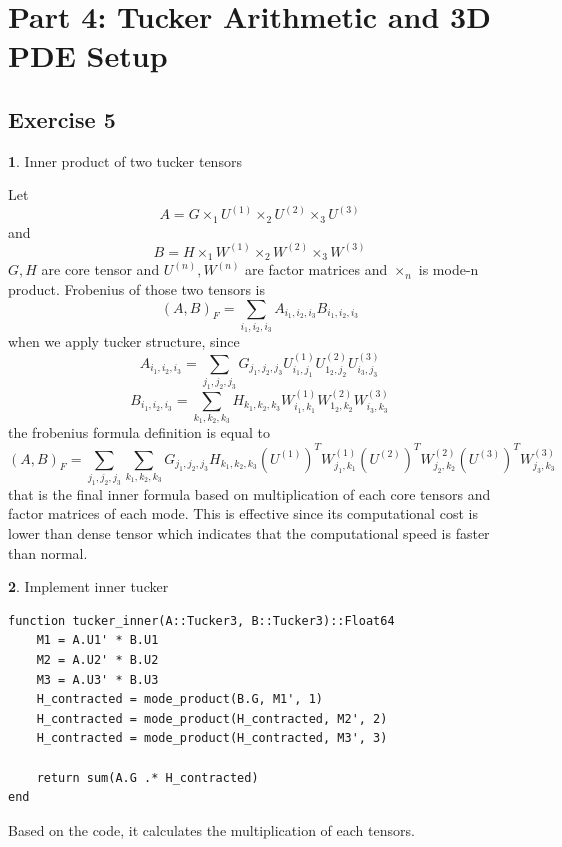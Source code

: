 \documentclass[11pt]{article}
\begin{document}
\section*{Part 4: Tucker Arithmetic and 3D PDE Setup}
\subsection*{Exercise 5}
\textbf{1}. Inner product of two tucker tensors

\vspace{1em}

Let
\[
A = G \times _1 U ^{(1)} \times _2 U ^{(2)} \times _3 U ^{(3)}
\]
and
\[
B = H\times _1 W ^{(1)} \times _2 W ^{(2)} \times _3 W ^{(3)}
\]
$G, H$ are core tensor and $U^{(n)}, W^{(n)}$ are factor matrices and $\times_n$ is mode-n product. Frobenius of those two tensors is 
\[
(A,B)_F = \sum_{i_1,i_2,i_3} A_{i_1,i_2,i_3} B_{i_1,i_2,i_3}
\]
when we apply tucker structure, since
\[
A_{i_1,i_2,i_3} = \sum_{j_1,j_2,j_3} G _{j_1,j_2,j_3} U ^{(1)}_{i_1,j_1} U ^{(2)} _{1_2,j_2}  U ^{(3)}_{i_3,j_3}
\]
\[
B_{i_1,i_2,i_3} = \sum_{k_1,k_2,k_3} H _{k_1,k_2,k_3} W ^{(1)}_{i_1,k_1} W ^{(2)} _{1_2,k_2}  W ^{(3)}_{i_3,k_3}
\]
the frobenius formula definition is equal to 
\[
(A,B)_F=\sum_{j_1,j_2,j_3}\sum_{k_1,k_2,k_3} G _{j_1,j_2,j_3} H _{k_1,k_2,k_3} \left( U^{(1)} \right)^T W^{(1)}_{j_1,k_1} \left( U^{(2)} \right)^T W^{(2)}_{j_2,k_2} \left( U^{(3)} \right)^T W^{(3)}_{j_3,k_3}
\]
that is the final inner formula based on multiplication of each core tensors and factor matrices of each mode. This is effective since its computational cost is lower than dense tensor which indicates that the computational speed is faster than normal.

\vspace{1.5em}

\textbf{2}. Implement inner tucker

\begin{lstlisting}
function tucker_inner(A::Tucker3, B::Tucker3)::Float64
    M1 = A.U1' * B.U1  
    M2 = A.U2' * B.U2  
    M3 = A.U3' * B.U3  
    H_contracted = mode_product(B.G, M1', 1)
    H_contracted = mode_product(H_contracted, M2', 2)
    H_contracted = mode_product(H_contracted, M3', 3)

    return sum(A.G .* H_contracted)
end

\end{lstlisting}
Based on the code, it calculates the multiplication of each tensors.
\end{document}
